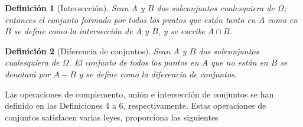 \documentclass[12pt]{article}
\newtheorem{definition}{Definición}
\begin{document}
\begin{definition}[Intersección]
    Sean $A$ y $B$ dos subconjuntos cualesquiera de $\Omega$; entonces el conjunto formado por todos los puntos que están tanto en $A$ como en $B$ se define como la intersección de $A$ y $B$, y se escribe $A \cap B$.
\end{definition}

\begin{definition}[Diferencia de conjuntos]
    Sean $A$ y $B$ dos subconjuntos cualesquiera de $\Omega$. El conjunto de todos los puntos en $A$ que no están en $B$ se denotará por $A-B$ y se define como la diferencia de conjuntos.
\end{definition}

Las operaciones de complemento, unión e intersección de conjuntos se han definido en las Definiciones 4 a 6, respectivamente. Estas operaciones de conjuntos satisfacen varias leyes, \cite{ash2000probability} proporciona las siguientes
\end{document}
